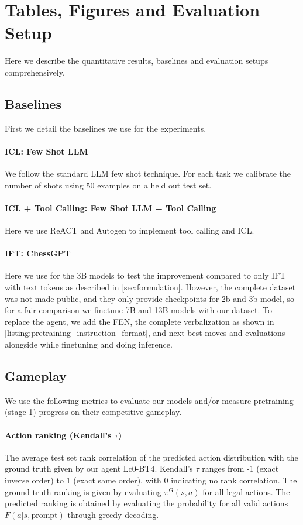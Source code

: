 

\section{Tables, Figures and Evaluation Setup}
Here we describe the quantitative results, baselines and evaluation setups comprehensively.
\subsection{Baselines} First we detail the baselines we use for the experiments.
\paragraph{ICL: Few Shot LLM} We follow the standard LLM few shot technique. For each task we calibrate the number of shots using 50 examples on a held out test set.
\paragraph{ICL + Tool Calling: Few Shot LLM + Tool Calling}
Here we use ReACT \cite{wu2023autogen} and Autogen \cite{wu2023autogen} to implement tool calling and ICL.
\paragraph{IFT: ChessGPT}
Here we use \cite{feng2024chessgpt} for the 3B models to test the improvement compared to only IFT with text tokens as described in \cref{sec:formulation}. However, the complete dataset was not made public, and they only provide checkpoints for 2b and 3b model, so for a fair comparison we finetune 7B and 13B models with our dataset. To replace the agent, we add the FEN, the complete verbalization as shown in \cref{listing:pretraining_instruction_format}, and next best moves and evaluations alongside while finetuning and doing inference.

\label{sec:addl-results}
\FloatBarrier
\subsection{Gameplay}
\label{app:gameplay_eval}
We use the following metrics to evaluate our models and/or measure pretraining (stage-1) progress on their competitive gameplay.

\paragraph{Action ranking (Kendall's $\tau$)}
The average test set rank correlation of the predicted action distribution with the ground truth given by our agent Lc0-BT4. Kendall's $\tau$ ranges from -1 (exact inverse order) to 1 (exact same order), with 0 indicating no rank correlation. The ground-truth ranking is given by evaluating $\pi^\text{G}(s,a)$ for all legal actions. The predicted ranking is obtained by evaluating the probability for all valid actions $F(a|s, \text{prompt})$ through greedy decoding.

